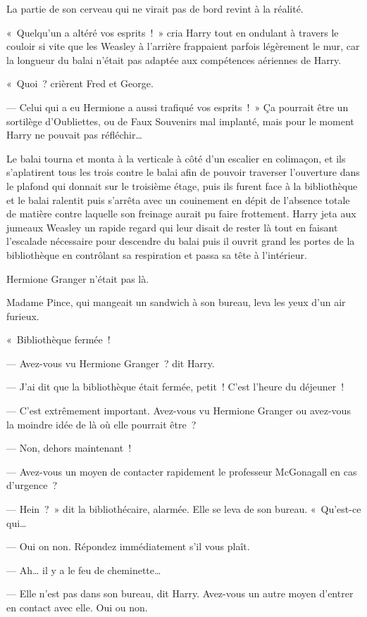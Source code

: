 La partie de son cerveau qui ne virait pas de bord revint à la réalité.

«~Quelqu'un a altéré vos esprits~!~» cria Harry tout en ondulant à travers le couloir si vite que les Weasley à l'arrière frappaient parfois légèrement le mur, car la longueur du balai n'était pas adaptée aux compétences aériennes de Harry.

«~Quoi~? crièrent Fred et George.

--- Celui qui a eu Hermione a aussi trafiqué vos esprits~!~» Ça pourrait être un sortilège d'Oubliettes, ou de Faux Souvenirs mal implanté, mais pour le moment Harry ne pouvait pas réfléchir…

Le balai tourna et monta à la verticale à côté d'un escalier en colimaçon, et ils s'aplatirent tous les trois contre le balai afin de pouvoir traverser l'ouverture dans le plafond qui donnait sur le troisième étage, puis ils furent face à la bibliothèque et le balai ralentit puis s'arrêta avec un couinement en dépit de l'absence totale de matière contre laquelle son freinage aurait pu faire frottement. Harry jeta aux jumeaux Weasley un rapide regard qui leur disait de rester là tout en faisant l'escalade nécessaire pour descendre du balai puis il ouvrit grand les portes de la bibliothèque en contrôlant sa respiration et passa sa tête à l'intérieur.

Hermione Granger n'était pas là.

Madame Pince, qui mangeait un sandwich à son bureau, leva les yeux d'un air furieux.

«~Bibliothèque fermée~!

--- Avez-vous vu Hermione Granger~? dit Harry.

--- J'ai dit que la bibliothèque était fermée, petit~! C'est l'heure du déjeuner~!

--- C'est extrêmement important. Avez-vous vu Hermione Granger ou avez-vous la moindre idée de là où elle pourrait être~?

--- Non, dehors maintenant~!

--- Avez-vous un moyen de contacter rapidement le professeur McGonagall en cas d'urgence~?

--- Hein~?~» dit la bibliothécaire, alarmée. Elle se leva de son bureau. «~Qu'est-ce qui…

--- Oui on non. Répondez immédiatement s'il vous plaît.

--- Ah… il y a le feu de cheminette…

--- Elle n'est pas dans son bureau, dit Harry. Avez-vous un autre moyen d'entrer en contact avec elle. Oui ou non.


